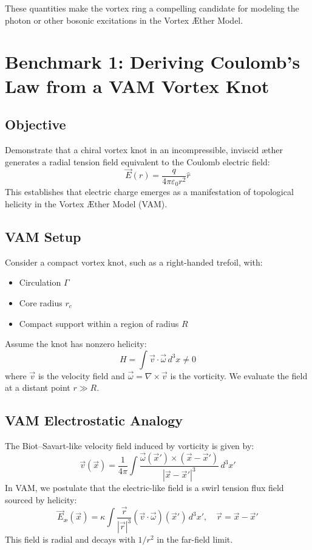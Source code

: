 \documentclass[preprint]{revtex4-2}
\begin{document}
These quantities make the vortex ring a compelling candidate for modeling the photon or other bosonic excitations in the Vortex Æther Model.
\section{Benchmark 1: Deriving Coulomb's Law from a VAM Vortex Knot}

\subsection*{Objective}
Demonstrate that a chiral vortex knot in an incompressible, inviscid æther generates a radial tension field equivalent to the Coulomb electric field:
\[
\vec{E}(r) = \frac{q}{4\pi \varepsilon_0 r^2} \hat{r}
\]
This establishes that electric charge emerges as a manifestation of topological helicity in the Vortex Æther Model (VAM).

\subsection*{VAM Setup}
Consider a compact vortex knot, such as a right-handed trefoil, with:
\begin{itemize}
    \item Circulation $\Gamma$
    \item Core radius $r_c$
    \item Compact support within a region of radius $R$
\end{itemize}
Assume the knot has nonzero helicity:
\[
H = \int \vec{v} \cdot \vec{\omega} \, d^3x \neq 0
\]
where $\vec{v}$ is the velocity field and $\vec{\omega} = \nabla \times \vec{v}$ is the vorticity. We evaluate the field at a distant point $r \gg R$.

\subsection*{VAM Electrostatic Analogy}
The Biot--Savart-like velocity field induced by vorticity is given by:
\[
\vec{v}(\vec{x}) = \frac{1}{4\pi} \int \frac{\vec{\omega}(\vec{x}') \times (\vec{x} - \vec{x}')}{|\vec{x} - \vec{x}'|^3} \, d^3x'
\]
In VAM, we postulate that the electric-like field is a swirl tension flux field sourced by helicity:
\[
\vec{E}_\text{\ae}(\vec{x}) = \kappa \int \frac{\vec{r}}{|\vec{r}|^3} \left( \vec{v} \cdot \vec{\omega} \right)(\vec{x}') \, d^3x', \quad \vec{r} = \vec{x} - \vec{x}'
\]
This field is radial and decays with $1/r^2$ in the far-field limit.
\end{document}
